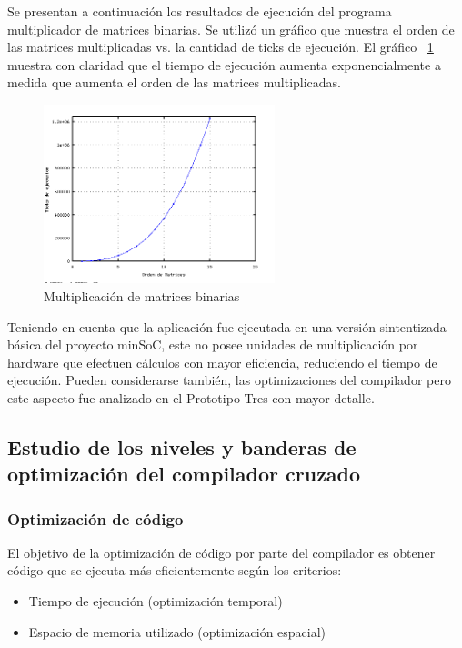 		Se presentan a continuación los resultados de ejecución del programa multiplicador de matrices binarias. Se utilizó un gráfico que muestra el orden
		de las matrices multiplicadas vs. la cantidad de ticks de ejecución. El gráfico ~\ref{fig:mulmat} muestra con claridad que el tiempo de ejecución
		aumenta exponencialmente a medida que aumenta el orden de las matrices multiplicadas.
		
\begin{figure}[h!]
 	\begin{center}
  	\includegraphics[width=0.6\textwidth,keepaspectratio=true]{./images/matrices}
  	\caption{Multiplicación de matrices binarias}
  	\label{fig:mulmat}
 	\end{center}
	\end{figure}

		Teniendo en cuenta que la aplicación fue ejecutada en una versión sintentizada básica del proyecto minSoC, este no posee unidades de multiplicación
		por hardware que efectuen cálculos con mayor eficiencia, reduciendo el tiempo de ejecución. Pueden considerarse también, las optimizaciones del
		compilador pero este aspecto fue analizado en el Prototipo Tres con mayor detalle. 	

        \subsection{Estudio de los niveles y banderas de optimización del compilador cruzado}
		\subsubsection{Optimización de código}
		
El objetivo de la optimización de código por parte del compilador es obtener código que se ejecuta más eficientemente según los criterios:
\begin{itemize}
  \item Tiempo de ejecución (optimización temporal)
  \item Espacio de memoria utilizado (optimización espacial) 
\end{itemize}
 
